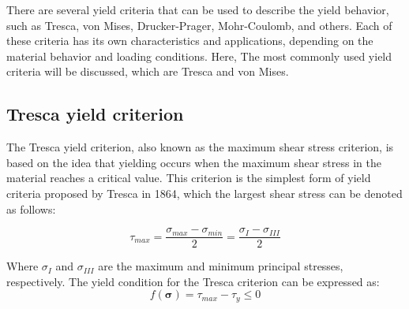 \documentclass[12pt]{article}
\begin{document}
\hspace{2em}There are several yield criteria that can be used to describe the
yield behavior, such as Tresca, von Mises, Drucker-Prager, Mohr-Coulomb, and others. Each of these criteria has its own
characteristics and applications, depending on the material behavior and loading conditions. Here, The most commonly used yield
criteria will be discussed, which are Tresca and von Mises.
\subsection{Tresca yield criterion}
\hspace{2em}The Tresca yield criterion, also known as the maximum shear stress criterion, is based on the idea that
yielding occurs when the maximum shear stress in the material reaches a critical value.
This criterion is the simplest form of yield criteria proposed by Tresca in 1864, which the largest shear stress can be denoted 
as follows:

\begin{equation}
    \tau_{max} = \frac{\sigma_{max} - \sigma_{min}}{2} = \frac{\sigma_{I} - \sigma_{III}}{2}
\end{equation}

Where $\sigma_{I}$ and $\sigma_{III}$ are the maximum and minimum principal stresses, respectively. The yield condition
for the Tresca criterion can be expressed as:
\begin{equation}
    f(\boldsymbol{\sigma}) = \tau_{max} - \tau_y \leq 0
\end{equation}
\end{document}
